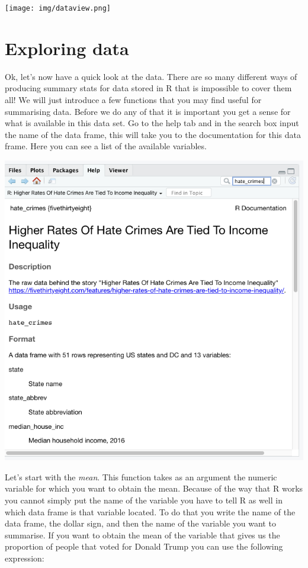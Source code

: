 \documentclass[]{book}
\begin{document}
\texttt{[image: img/dataview.png]}

\hypertarget{exploring-data}{%
\section{Exploring data}\label{exploring-data}}

Ok, let's now have a quick look at the data. There are so many different ways of producing summary stats for data stored in R that is impossible to cover them all! We will just introduce a few functions that you may find useful for summarising data. Before we do any of that it is important you get a sense for what is available in this data set. Go to the help tab and in the search box input the name of the data frame, this will take you to the documentation for this data frame. Here you can see a list of the available variables.

\includegraphics{img/codebook.png}

Let's start with the \emph{mean}. This function takes as an argument the numeric variable for which you want to obtain the mean. Because of the way that R works you cannot simply put the name of the variable you have to tell R as well in which data frame is that variable located. To do that you write the name of the data frame, the dollar sign, and then the name of the variable you want to summarise. If you want to obtain the mean of the variable that gives us the proportion of people that voted for Donald Trump you can use the following expression:
\end{document}
